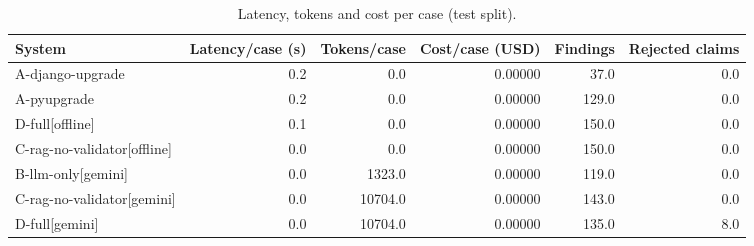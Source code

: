 \begin{table}[t]
\centering
\small
\caption{Latency, tokens and cost per case (test split).}
\label{tab:cost-test}
\begin{tabular}{lrrrrr}
\toprule
System & Latency/case (s) & Tokens/case & Cost/case (USD) & Findings & Rejected claims \\
\midrule
A-django-upgrade & 0.2 & 0.0 & 0.00000 & 37.0 & 0.0 \\
A-pyupgrade & 0.2 & 0.0 & 0.00000 & 129.0 & 0.0 \\
D-full[offline] & 0.1 & 0.0 & 0.00000 & 150.0 & 0.0 \\
C-rag-no-validator[offline] & 0.0 & 0.0 & 0.00000 & 150.0 & 0.0 \\
B-llm-only[gemini] & 0.0 & 1323.0 & 0.00000 & 119.0 & 0.0 \\
C-rag-no-validator[gemini] & 0.0 & 10704.0 & 0.00000 & 143.0 & 0.0 \\
D-full[gemini] & 0.0 & 10704.0 & 0.00000 & 135.0 & 8.0 \\
\bottomrule
\end{tabular}
\end{table}

